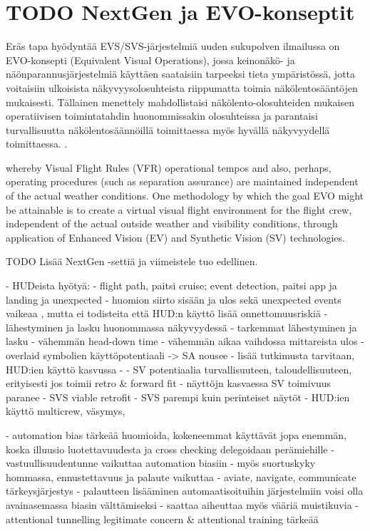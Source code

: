 \documentclass[utf8,bachelor,manualbib]{gradu3}
\begin{document}
\section{TODO NextGen ja EVO-konseptit}

Eräs tapa hyödyntää EVS/SVS-järjestelmiä uuden sukupolven ilmailussa on EVO-konsepti (Equivalent Visual Operations), jossa keinonäkö- ja näönparannusjärjestelmiä käyttäen saataisiin tarpeeksi tieta ympäristössä, jotta voitaisiin ulkoisista näkyvyysolosuhteista riippumatta toimia näkölentosääntöjen mukaisesti. Tällainen menettely mahdollistaisi näkölento-olosuhteiden mukaisen operatiivisen toimintatahdin huonommissakin olosuhteissa ja parantaisi turvallisuutta näkölentosäännöillä toimittaessa myös hyvällä näkyvyydellä toimittaessa. \citep{prinzel2013}.

whereby Visual Flight Rules (VFR) operational tempos and also, perhaps, operating
procedures (such as separation assurance) are maintained independent of the actual weather conditions. One
methodology by which the goal EVO might be attainable is to create a virtual visual flight environment for
the flight crew, independent of the actual outside weather and visibility conditions, through application of
Enhanced Vision (EV) and Synthetic Vision (SV) technologies. \citep{baileyym2007}

TODO Lisää NextGen -settiä ja viimeistele tuo edellinen.

- HUDeista hyötyä:
	- flight path, paitsi cruise; event detection, paitsi app ja landing ja unexpected
	- huomion siirto sisään ja ulos sekä unexpected events vaikeaa , mutta ei todisteita että HUD:n käyttö lisää onnettomuusriskiä
	- lähestyminen ja lasku huonommassa näkyvyydessä
	- tarkemmat lähestyminen ja lasku
	- vähemmän head-down time
	- vähemmän aikaa vaihdossa mittareista ulos
	- overlaid symbolien käyttöpotentiaali -> SA nousee
	- lisää tutkimusta tarvitaan, HUD:ien käyttö kasvussa
	-  \citep{crawfordneal2006}
- SV potentiaalia turvallisuuteen, taloudellisuuteen, erityisesti jos toimii retro \& forward fit
- näyttöjn kasvaessa SV toimivuus paranee
- SVS viable retrofit \citep{prinzel2004}
- SVS parempi kuin perinteiset näytöt \citep{schnellym2004}
- HUD:ien käyttö multicrew, väsymys, \citep{crawfordneal2006}

- automation bias tärkeää huomioida, kokeneemmat käyttävät jopa enemmän, koska illuusio luotettavuudesta ja cross checking delegoidaan perämiehille
- vastuullisuudentunne vaikuttaa automation biasiin \citep{mosierym1998}
- myös suortuskyky hommassa, ennustettavuus ja palaute vaikuttaa
- aviate, navigate, communicate tärkeysjärjestys
- palautteen lisääminen automaatisoituihin järjestelmiin voisi olla avainasemassa biasin välttämiseksi
- saattaa aiheuttaa myös vääriä muistikuvia  \citep{mosierym1998}
- attentional tunnelling legitimate concern \& attentional training tärkeää \citep{wickensalexander2009}
\end{document}
